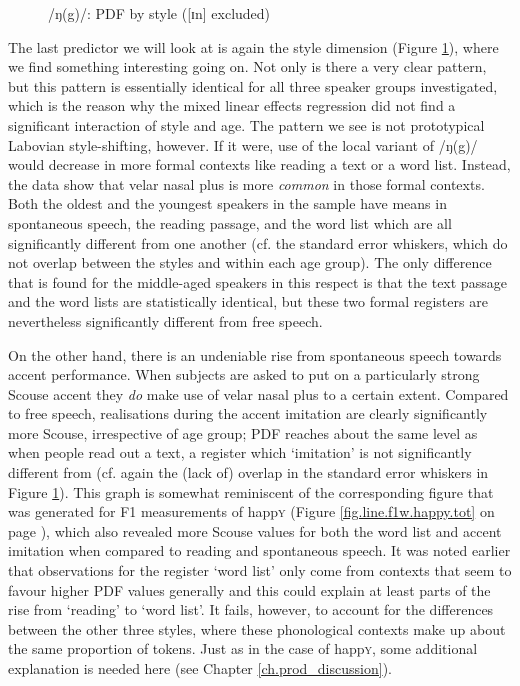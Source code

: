 \begin{figure}[h]
	\centering
		\resizebox{0.5\linewidth}{!}{} 
	\caption{/ŋ(g)/: PDF by style ([ɪn] excluded)}
	\label{fig.line.ng.tot}
\end{figure}

The last predictor we will look at is again the style dimension (Figure \ref{fig.line.ng.tot}), where we find something interesting going on.
Not only is there a very clear pattern, but this pattern is essentially identical for all three speaker groups investigated, which is the reason why the mixed linear effects regression did not find a significant interaction of style and age.
The pattern we see is not prototypical Labovian style-shifting, however.
If it were, use of the local variant of /ŋ(g)/ would decrease in more formal contexts like reading a text or a word list.
Instead, the data show that velar nasal plus is more \emph{common} in those formal contexts.
Both the oldest and the youngest speakers in the sample have means in spontaneous speech, the reading passage, and the word list which are all significantly different from one another (cf. the standard error whiskers, which do not overlap between the styles and within each age group).
The only difference that is found for the middle-aged speakers in this respect is that the text passage and the word lists are statistically identical, but these two formal registers are nevertheless significantly different from free speech.

On the other hand, there is an undeniable rise from spontaneous speech towards accent performance.
When subjects are asked to put on a particularly strong Scouse accent they \emph{do} make use of velar nasal plus to a certain extent.
Compared to free speech, realisations during the accent imitation are clearly significantly more Scouse, irrespective of age group; PDF reaches about the same level as when people read out a text, a register which `imitation' is not significantly different from (cf. again the (lack of) overlap in the standard error whiskers in Figure \ref{fig.line.ng.tot}).
This graph is somewhat reminiscent of the corresponding figure that was generated for F1 measurements of happ\textsc{y} (Figure \ref{fig.line.f1w.happy.tot} on page \pageref{fig.line.f1w.happy.tot}), which also revealed more Scouse values for both the word list and accent imitation when compared to reading and spontaneous speech.
It was noted earlier that observations for the register `word list' only come from contexts that seem to favour higher PDF values generally and this could explain at least parts of the rise from `reading' to `word list'.
It fails, however, to account for the differences between the other three styles, where these phonological contexts make up about the same proportion of tokens.
Just as in the case of happ\textsc{y}, some additional explanation is needed here (see Chapter \ref{ch.prod_discussion}).

